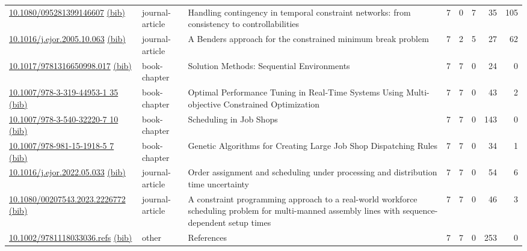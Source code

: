 {\begin{longtable}{p{5cm}lp{11cm}rrrrr}
\href{http://dx.doi.org/10.1080/095281399146607}{10.1080/095281399146607} \href{https://www.doi2bib.org/bib/10.1080/095281399146607}{(bib)} & journal-article & Handling contingency in temporal constraint networks: from consistency to controllabilities & 7 & 0 & 7 & 35 & 105 \\
\href{http://dx.doi.org/10.1016/j.ejor.2005.10.063}{10.1016/j.ejor.2005.10.063} \href{https://www.doi2bib.org/bib/10.1016/j.ejor.2005.10.063}{(bib)} & journal-article & A Benders approach for the constrained minimum break problem & 7 & 2 & 5 & 27 & 62 \\
\href{http://dx.doi.org/10.1017/9781316650998.017}{10.1017/9781316650998.017} \href{https://www.doi2bib.org/bib/10.1017/9781316650998.017}{(bib)} & book-chapter & Solution Methods: Sequential Environments & 7 & 7 & 0 & 24 & 0 \\
\href{http://dx.doi.org/10.1007/978-3-319-44953-1_35}{10.1007/978-3-319-44953-1 35} \href{https://www.doi2bib.org/bib/10.1007/978-3-319-44953-1_35}{(bib)} & book-chapter & Optimal Performance Tuning in Real-Time Systems Using Multi-objective Constrained Optimization & 7 & 7 & 0 & 43 & 2 \\
\href{http://dx.doi.org/10.1007/978-3-540-32220-7_10}{10.1007/978-3-540-32220-7 10} \href{https://www.doi2bib.org/bib/10.1007/978-3-540-32220-7_10}{(bib)} & book-chapter & Scheduling in Job Shops & 7 & 7 & 0 & 143 & 0 \\
\href{http://dx.doi.org/10.1007/978-981-15-1918-5_7}{10.1007/978-981-15-1918-5 7} \href{https://www.doi2bib.org/bib/10.1007/978-981-15-1918-5_7}{(bib)} & book-chapter & Genetic Algorithms for Creating Large Job Shop Dispatching Rules & 7 & 7 & 0 & 34 & 1 \\
\href{http://dx.doi.org/10.1016/j.ejor.2022.05.033}{10.1016/j.ejor.2022.05.033} \href{https://www.doi2bib.org/bib/10.1016/j.ejor.2022.05.033}{(bib)} & journal-article & Order assignment and scheduling under processing and distribution time uncertainty & 7 & 7 & 0 & 54 & 6 \\
\href{http://dx.doi.org/10.1080/00207543.2023.2226772}{10.1080/00207543.2023.2226772} \href{https://www.doi2bib.org/bib/10.1080/00207543.2023.2226772}{(bib)} & journal-article & A constraint programming approach to a real-world workforce scheduling problem for multi-manned assembly lines with sequence-dependent setup times & 7 & 7 & 0 & 46 & 3 \\
\href{http://dx.doi.org/10.1002/9781118033036.refs}{10.1002/9781118033036.refs} \href{https://www.doi2bib.org/bib/10.1002/9781118033036.refs}{(bib)} & other & References & 7 & 7 & 0 & 253 & 0 \\

\end{longtable}}
